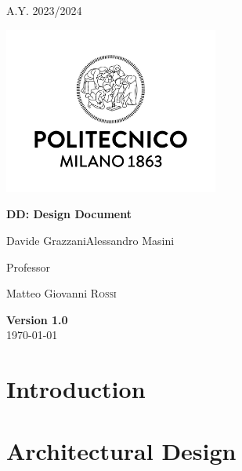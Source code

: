 \documentclass[table, 12pt]{article}
\begin{document}
    
    \begin{titlepage}
        \centering
        {\scshape\large A.Y. 2023/2024 \par}
        \vfill
        \includegraphics[width=200pt]{assets/logo_polimi}\par\vspace{1cm}
        \vspace{0.5cm}
        {\huge\bfseries DD\@: Design Document \par}
        \vspace{1cm}
        {\large {Davide Grazzani\quad Alessandro Masini}\par}
        \vfill
        {\large Professor\par
            Matteo Giovanni \textsc{Rossi}}
        \vfill
        {\large \textbf{Version 1.0}\\ \today \par}
    \end{titlepage}
    
    \thispagestyle{plain}

    \mbox{}

    \newpage
    \tableofcontents

    \newpage

    \section{Introduction}\label{sec:introduction}
        
        \newpage

    \section{Architectural Design}\label{sec:architectural_design}
        
        \newpage
\end{document}
